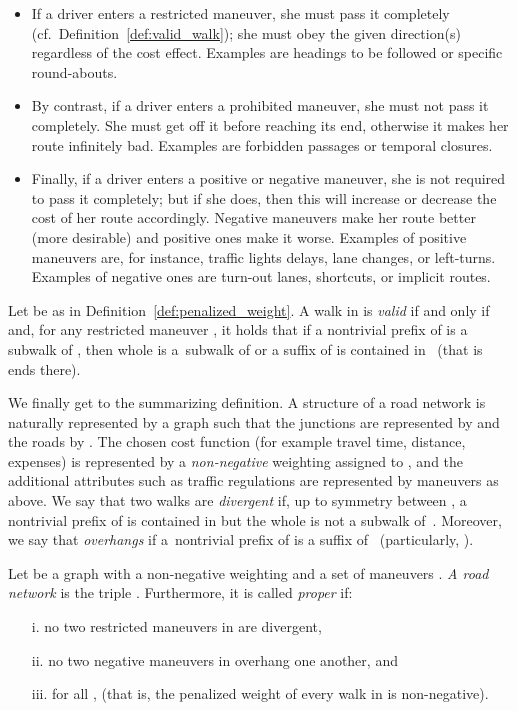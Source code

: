 \documentclass[envcountsect,envcountsame]{llncs}
\begin{document}
\begin{itemize}
\parskip2pt
\item If a driver enters a restricted maneuver, she must pass it completely
  (cf.~Definition~\ref{def:valid_walk}); 
  she must obey the given direction(s) regardless of the cost effect.
  Examples are headings to be followed or specific round-abouts.

\item By contrast, if a driver enters a prohibited maneuver, she must 
  not pass it completely. She must get off it before reaching its end, 
  otherwise it makes her route infinitely bad. Examples are forbidden 
  passages or temporal closures.

\item Finally, if a driver enters a positive or negative maneuver, she is
  not required to pass it completely;
  but if she does, then this will increase or decrease the 
  cost of her route accordingly. Negative maneuvers make her route 
  better (more desirable) and positive ones make it worse.
  Examples of positive maneuvers are, for instance, traffic lights delays, lane
  changes, or left-turns.
  Examples of negative ones are turn-out lanes, shortcuts, or implicit routes.
\end{itemize}

\begin{definition}
\label{def:valid_walk}
Let  be as in Definition~\ref{def:penalized_weight}. A walk 
 in  is \emph{valid} if and only if  and, for any
restricted maneuver , it holds that if a nontrivial prefix of
 is a subwalk of , then whole  is a~subwalk of  or a suffix of 
is contained in~ (that is  ends there).
\end{definition}

We finally get to the summarizing definition. A structure of a road network 
is naturally represented by a graph  such that the junctions are 
represented by  and the roads by . The chosen cost function 
(for example travel time, distance, expenses) is represented by a \emph{non-negative}
weighting  assigned to , and the additional 
attributes such as traffic regulations are represented by maneuvers as above.
We say that two walks  are {\em divergent} if, up to symmetry
between , a nontrivial prefix of  is contained in  but
the whole  is not a subwalk of~. Moreover, we say that  
{\em overhangs}  if a~nontrivial prefix of  is a suffix of~
(particularly, ).

\begin{definition}
\label{def:road_network}
Let  be a graph with a non-negative weighting  and a set of maneuvers 
. \emph{A road network} is the triple . 
Furthermore, it is called \emph{proper} if:
\begin{itemize}
\parskip 2pt
\item[i.] no two restricted maneuvers in  are divergent,
\item[ii.] no two negative maneuvers in  overhang one another, and
\item[iii.] for all ,  (that is, the penalized weight of every walk in  is 
  non-negative). \end{itemize}
\vspace{-4pt}
\end{definition}
\end{document}
